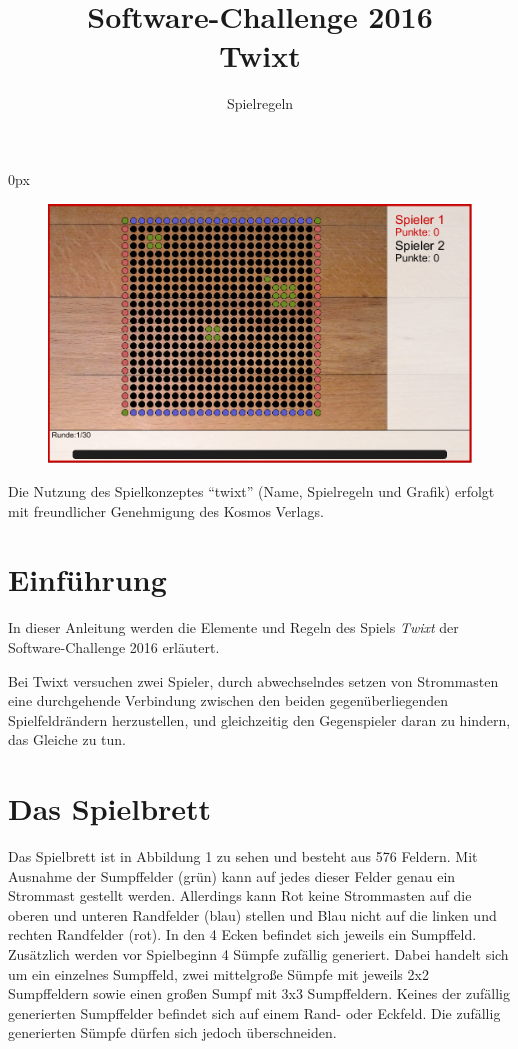 \documentclass[a4paper, ngerman]{scrartcl}
\title{Software-Challenge 2016 \\ Twixt}
\subtitle{Spielregeln}
\begin{document}
\parindent0px
\maketitle

\begin{figure}[h!]
        \centering
        \includegraphics[width=\linewidth]{bilder/gui.png}
\end{figure}
\vspace*{\fill}

Die Nutzung des Spielkonzeptes "`twixt"' (Name, Spielregeln und Grafik)
erfolgt mit freundlicher Genehmigung des Kosmos Verlags.

\newpage

\tableofcontents

\newpage

\section{Einführung}

In dieser Anleitung werden die Elemente und Regeln des Spiels \emph{Twixt} der
Software-Challenge 2016 erläutert.

Bei Twixt versuchen zwei Spieler, durch abwechselndes setzen von Strommasten
eine durchgehende Verbindung zwischen den beiden gegenüberliegenden Spielfeldrändern
herzustellen, und gleichzeitig den Gegenspieler daran zu hindern, das Gleiche zu
tun. 

\section{Das Spielbrett}
Das Spielbrett ist in Abbildung 1 zu sehen und besteht aus 576 Feldern.
Mit Ausnahme der Sumpffelder (grün) kann auf jedes dieser Felder genau 
ein Strommast gestellt werden. Allerdings kann Rot keine Strommasten auf 
die oberen und unteren Randfelder (blau) stellen und Blau nicht auf die linken 
und rechten Randfelder (rot). In den 4 Ecken befindet sich jeweils ein Sumpffeld. 
Zusätzlich werden vor Spielbeginn 4 Sümpfe zufällig generiert. Dabei handelt sich um 
ein einzelnes Sumpffeld, zwei mittelgroße Sümpfe mit jeweils 2x2 Sumpffeldern 
sowie einen großen Sumpf mit 3x3 Sumpffeldern. Keines der zufällig generierten Sumpffelder 
befindet sich auf einem Rand- oder Eckfeld. Die zufällig generierten Sümpfe dürfen 
sich jedoch überschneiden.
\end{document}
